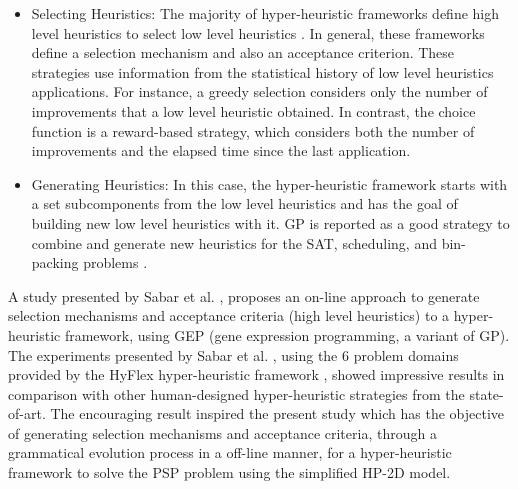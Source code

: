 \documentclass[conference]{IEEEtran}
\begin{document}
\begin{itemize}
	\item Selecting Heuristics: The majority of  hyper-heuristic frameworks define high level heuristics to select low level heuristics \cite{burke2013hyper}. In general, these frameworks define a selection mechanism and also an acceptance criterion. These strategies use information from the statistical history of low level heuristics applications. For instance, a greedy selection considers only the number of improvements that a low level heuristic obtained. In contrast, the choice function \cite{burke2013hyper} is a reward-based strategy, which considers both the number of improvements and the elapsed time since the last application.
	
	
	
	
	
	
	
	
	
%	
	

	\item Generating Heuristics: In this case, the hyper-heuristic framework starts with a set subcomponents  from the low level heuristics and has the goal of building new low level heuristics with it. GP is reported as a good strategy to combine and generate new heuristics for the SAT, scheduling, and bin-packing problems \cite{sabar2015automatic}.
\end{itemize}


A study presented by Sabar et al. \cite{sabar2015automatic}, proposes an on-line approach to generate selection mechanisms and acceptance criteria (high level heuristics) to a hyper-heuristic framework, using GEP \cite{ferreira2008gene} (gene expression programming, a variant of GP). The experiments presented by Sabar et al. \cite{sabar2015automatic}, using the 6 problem domains provided by the HyFlex hyper-heuristic framework \cite{ochoa2012hyflex}, showed impressive   results in  comparison  with other human-designed hyper-heuristic strategies from the state-of-art. The encouraging result inspired the present study which has the objective of
 generating selection mechanisms and acceptance criteria, through a grammatical evolution process in a off-line manner, for a hyper-heuristic framework to solve the PSP problem using the simplified HP-2D model.
\end{document}
